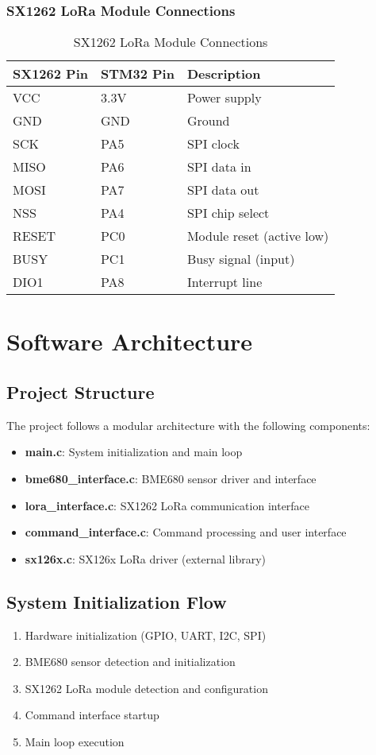 \documentclass[11pt,a4paper]{article}
\begin{document}
\subsubsection{SX1262 LoRa Module Connections}
\begin{table}[h]
\centering
\begin{tabular}{|l|l|l|}
\hline
\textbf{SX1262 Pin} & \textbf{STM32 Pin} & \textbf{Description} \\
\hline
VCC & 3.3V & Power supply \\
\hline
GND & GND & Ground \\
\hline
SCK & PA5 & SPI clock \\
\hline
MISO & PA6 & SPI data in \\
\hline
MOSI & PA7 & SPI data out \\
\hline
NSS & PA4 & SPI chip select \\
\hline
RESET & PC0 & Module reset (active low) \\
\hline
BUSY & PC1 & Busy signal (input) \\
\hline
DIO1 & PA8 & Interrupt line \\
\hline
\end{tabular}
\caption{SX1262 LoRa Module Connections}
\end{table}

\section{Software Architecture}

\subsection{Project Structure}
The project follows a modular architecture with the following components:

\begin{itemize}
    \item \textbf{main.c}: System initialization and main loop
    \item \textbf{bme680\_interface.c}: BME680 sensor driver and interface
    \item \textbf{lora\_interface.c}: SX1262 LoRa communication interface
    \item \textbf{command\_interface.c}: Command processing and user interface
    \item \textbf{sx126x.c}: SX126x LoRa driver (external library)
\end{itemize}

\subsection{System Initialization Flow}
\begin{enumerate}
    \item Hardware initialization (GPIO, UART, I2C, SPI)
    \item BME680 sensor detection and initialization
    \item SX1262 LoRa module detection and configuration
    \item Command interface startup
    \item Main loop execution
\end{enumerate}
\end{document}
